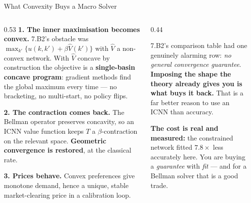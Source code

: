 \begin{frame}{What Convexity Buys a Macro Solver}
\begin{columns}[T]
\begin{column}{0.53\textwidth}
\small
\textbf{1. The inner maximisation becomes convex.} 7.B2's obstacle was $\max_{k'}\{u(k,k')+\beta\hat V(k')\}$ with $\hat V$ a non-convex network. With $\hat V$ concave by construction the objective is a \textbf{single-basin concave program}: gradient methods find the global maximum every time --- no bracketing, no multi-start, no policy flips.
\medskip

\textbf{2. The contraction comes back.} The Bellman operator preserves concavity, so an ICNN value function keeps $T$ a $\beta$-contraction on the relevant space. \textbf{Geometric convergence is restored}, at the classical rate.
\medskip

\textbf{3. Prices behave.} Convex preferences give monotone demand, hence a unique, stable market-clearing price in a calibration loop.
\end{column}
\begin{column}{0.44\textwidth}
\begin{takeawaybox}[title=\textbf{Read benefit 2 again}]\small
7.B2's comparison table had one genuinely alarming row: \emph{no general convergence guarantee}.
\medskip
\textbf{Imposing the shape the theory already gives you is what buys it back.} That is a far better reason to use an ICNN than accuracy.
\end{takeawaybox}
\medskip
\begin{examplebox}\footnotesize
\textbf{The cost is real and measured:} the constrained network fitted $7.8\times$ less accurately here. You are buying a \emph{guarantee} with \emph{fit} --- and for a Bellman solver that is a good trade.
\end{examplebox}
\end{column}
\end{columns}
\end{frame}

